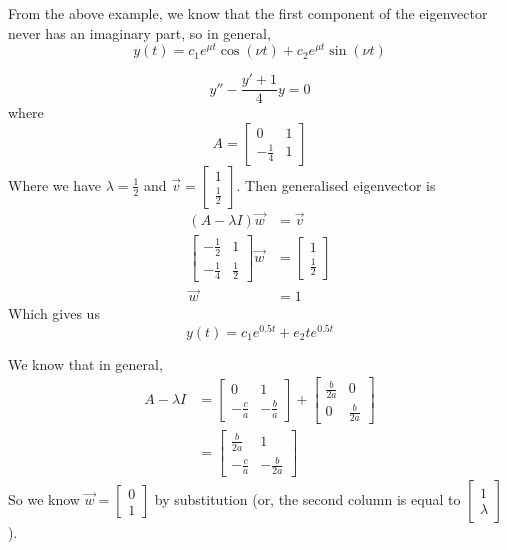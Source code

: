 \documentclass[12pt]{article}
\begin{document}
From the above example, we know that the first component of the eigenvector never has an imaginary part, so in general,
$$y(t) = c_1e^{\mu t}\cos(\nu t) + c_2e^{\mu t}\sin(\nu t)$$
	
\begin{ex}
	$$y''-\frac{y'+1}{4}y = 0$$
	where
	$$A = \begin{bmatrix} 0 & 1 \\ -\frac{1}{4} & 1\end{bmatrix}$$
	Where we have $\lambda = \frac{1}{2}$ and $\vec{v} = \begin{bmatrix} 1 \\ \frac{1}{2}\end{bmatrix}$. Then generalised eigenvector is
	\begin{align*}
		(A-\lambda I)\vec{w} &= \vec{v} \\
		\begin{bmatrix} -\frac{1}{2} & 1 \\ -\frac{1}{4} & \frac{1}{2}\end{bmatrix}\vec{w} &= \begin{bmatrix} 1 \\ \frac{1}{2}\end{bmatrix} \\
		\vec{w} &= 1
	\end{align*}
	Which gives us
	$$y(t) = c_1e^{0.5t} + e_2te^{0.5t}$$
\end{ex}

We know that in general,
\begin{align*}
	A - \lambda I &= \begin{bmatrix} 0 & 1 \\ -\frac{c}{a} & -\frac{b}{a}\end{bmatrix} + \begin{bmatrix} \frac{b}{2a} & 0 \\ 0 & \frac{b}{2a}\end{bmatrix} \\
		      &= \begin{bmatrix} \frac{b}{2a} & 1 \\ -\frac{c}{a} & -\frac{b}{2a}\end{bmatrix}
\end{align*}
So we know $\vec{w} = \begin{bmatrix} 0 \\ 1\end{bmatrix}$ by substitution (or, the second column is equal to $\begin{bmatrix} 1 \\ \lambda\end{bmatrix}$).
\end{document}
